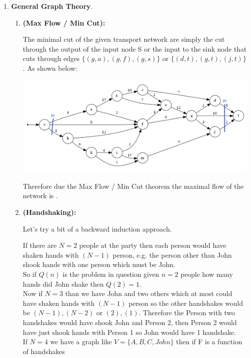\documentclass{article}
\begin{document}
\begin{enumerate}
    \item \textbf{General Graph Theory}.
    \begin{enumerate}
        \item \textbf{(Max Flow / Min Cut):}
        
        The minimal cut of the given transport network are simply the cut through the output of the input node S or the input to the sink node that cuts through edges $\{(g,a), (g, f), (g, s)\}$ or $\{(d,t), (g,t), (j,t)\}$. 
        As shown below:

        \includegraphics[scale=0.4]{2a}

        Therefore due the Max Flow / Min Cut theorem the maximal flow of the network is .

        \item \textbf{(Handshaking):}
        
        Let's try a bit of a backward induction approach.
        
        If there are $N = 2$ people at the party then each person would have shaken hands with $(N - 1)$ person, e.g. the person other than John shook hands with one person which must be John. \\

        So if $Q(n)$ is the problem in question given $n = 2$ people how many hands did John shake then $Q(2) = 1$. \\

        Now if $N = 3$ than we have John and two others which at most could have shaken hands with $(N - 1)$ person so the other handshakes would be $(N - 1), (N - 2)$ or $(2),(1)$.         
        Therefore the Person with two handshakes would have shook John and Person 2, then Person 2 would have just shook hands with Person 1 so John would have 1 handshake. \\

        If $N = 4$ we have a graph like $V = \{A, B, C, John\}$ then if F is a function of handshakes 
        

\end{enumerate}
\end{enumerate}
\end{document}
